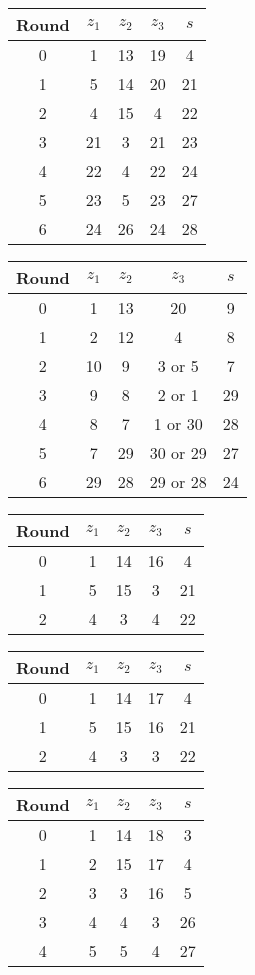 \begin{multicols}{2}
\begin{tabular}{c | c | c | c | c }
Round & $z_1$ & $z_2$ & $z_3$ & $s$ \\
\hline
0 & 1 & 13 & 19 & 4 \\
1 & 5 & 14 & 20 & 21 \\
2 & 4 & 15 & 4 & 22 \\
3 & 21 & 3 & 21 & 23 \\
4 & 22 & 4 & 22 & 24 \\
5 & 23 & 5 & 23 & 27 \\
6 & 24 & 26 & 24 & 28
\end{tabular}


\begin{tabular}{c | c | c | c | c }
Round & $z_1$ & $z_2$ & $z_3$ & $s$ \\
\hline
0 & 1 & 13 & 20 & 9 \\
1 & 2 & 12 & 4 & 8 \\
2 & 10 & 9 & 3 or 5 & 7 \\
3 & 9 & 8 & 2 or 1 & 29 \\
4 & 8 & 7 & 1 or 30 & 28 \\
5 & 7 & 29 & 30 or 29 & 27 \\
6 & 29 & 28 & 29 or 28 & 24
\end{tabular}


\begin{tabular}{c | c | c | c | c }
Round & $z_1$ & $z_2$ & $z_3$ & $s$ \\
\hline
0 & 1 & 14 & 16 & 4 \\
1 & 5 & 15 & 3 & 21 \\
2 & 4 & 3 & 4 & 22
\end{tabular}


\begin{tabular}{c | c | c | c | c }
Round & $z_1$ & $z_2$ & $z_3$ & $s$ \\
\hline
0 & 1 & 14 & 17 & 4 \\
1 & 5 & 15 & 16 & 21 \\
2 & 4 & 3 & 3 & 22
\end{tabular}


\begin{tabular}{c | c | c | c | c }
Round & $z_1$ & $z_2$ & $z_3$ & $s$ \\
\hline
0 & 1 & 14 & 18 & 3 \\
1 & 2 & 15 & 17 & 4 \\
2 & 3 & 3 & 16 & 5 \\
3 & 4 & 4 & 3 & 26 \\
4 & 5 & 5 & 4 & 27
\end{tabular}



\end{multicols}
